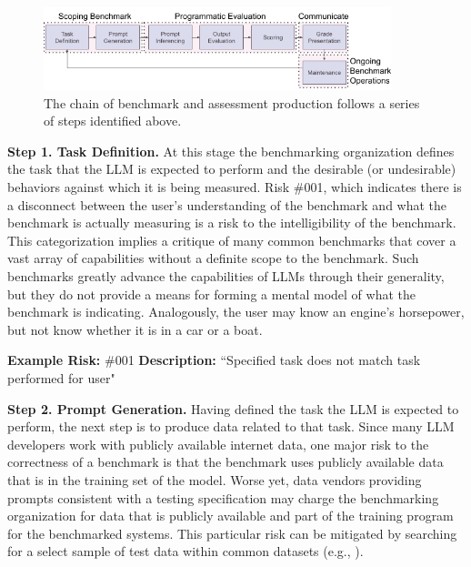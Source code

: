 \documentclass{article}
\begin{document}
\begin{figure}[h!]
  \centering
  \includegraphics[width=0.9\textwidth]{image1.png}
  \caption{The chain of benchmark and assessment production follows a series of steps identified above.}
  \label{fig:benchmark-production}
\end{figure}

{\bf Step 1. Task Definition.} At this stage the benchmarking organization defines the task that the LLM is expected to perform and the desirable (or undesirable) behaviors against which it is being measured. Risk \#001, which indicates there is a disconnect between the user's understanding of the benchmark and what the benchmark is actually measuring is a risk to the intelligibility of the benchmark. This categorization implies a critique of many common benchmarks that cover a vast array of capabilities without a definite scope to the benchmark. Such benchmarks greatly advance the capabilities of LLMs through their generality, but they do not provide a means for forming a mental model of what the benchmark is indicating. Analogously, the user may know an engine's horsepower, but not know whether it is in a car or a boat.

\begin{center}
    \begin{tcolorbox}[colback=gray!10, colframe=black!50, width=\textwidth, boxrule=0.5mm, sharp corners, coltext=black]
        {\bf Example Risk:} \#001
        \newline
        {\bf Description:} ``Specified task does not match task performed for user"
    \end{tcolorbox}
\end{center}

{\bf Step 2. Prompt Generation.} Having defined the task the LLM is expected to perform, the next step is to produce data related to that task. Since many LLM developers work with publicly available internet data, one major risk to the correctness of a benchmark is that the benchmark uses publicly available data that is in the training set of the model. Worse yet, data vendors providing prompts consistent with a testing specification may charge the benchmarking organization for data that is publicly available and part of the training program for the benchmarked systems. This particular risk can be mitigated by searching for a select sample of test data within common datasets (e.g., \cite{commoncrawl}).
\end{document}
